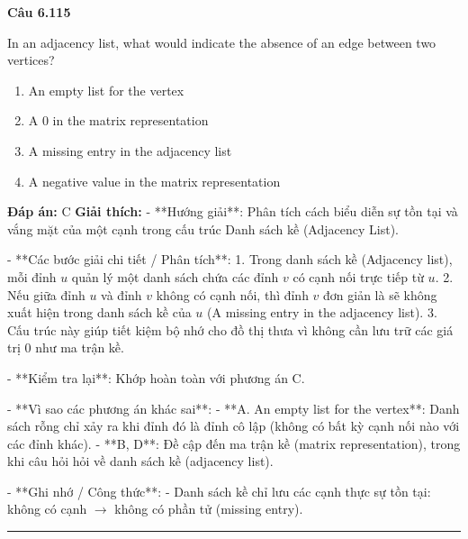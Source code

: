 \documentclass[11pt,a4paper]{article}
\newenvironment{question}[1]{%
  \par\vspace{1em}\noindent\textbf{\large Câu #1}\par\vspace{0.4em}
}{%
  \par\vspace{1em}\hrule\vspace{0.6em}
}
\newenvironment{choices}{%
  \begin{enumerate}[label=\textbf{\Alph*.},leftmargin=2.2em,itemsep=2pt,topsep=3pt]
}{%
  \end{enumerate}
}
\newcommand{\choice}{\item}
\begin{document}
\begin{question}{6.115}
In an adjacency list, what would indicate the absence of an edge between two vertices?
\begin{choices}
\choice An empty list for the vertex
\choice A 0 in the matrix representation
\choice A missing entry in the adjacency list
\choice A negative value in the matrix representation
\end{choices}
\textbf{Đáp án:} C
\textbf{Giải thích:} - **Hướng giải**:
  Phân tích cách biểu diễn sự tồn tại và vắng mặt của một cạnh trong cấu trúc Danh sách kề (Adjacency List).

- **Các bước giải chi tiết / Phân tích**:
  1. Trong danh sách kề (Adjacency list), mỗi đỉnh \(u\) quản lý một danh sách chứa các đỉnh \(v\) có cạnh nối trực tiếp từ \(u\).
  2. Nếu giữa đỉnh \(u\) và đỉnh \(v\) không có cạnh nối, thì đỉnh \(v\) đơn giản là sẽ không xuất hiện trong danh sách kề của \(u\) (A missing entry in the adjacency list).
  3. Cấu trúc này giúp tiết kiệm bộ nhớ cho đồ thị thưa vì không cần lưu trữ các giá trị 0 như ma trận kề.

- **Kiểm tra lại**:
  Khớp hoàn toàn với phương án C.

- **Vì sao các phương án khác sai**:
  - **A. An empty list for the vertex**: Danh sách rỗng chỉ xảy ra khi đỉnh đó là đỉnh cô lập (không có bất kỳ cạnh nối nào với các đỉnh khác).
  - **B, D**: Đề cập đến ma trận kề (matrix representation), trong khi câu hỏi hỏi về danh sách kề (adjacency list).

- **Ghi nhớ / Công thức**:
  - Danh sách kề chỉ lưu các cạnh thực sự tồn tại: không có cạnh \(\rightarrow\) không có phần tử (missing entry).
\end{question}
\end{document}
